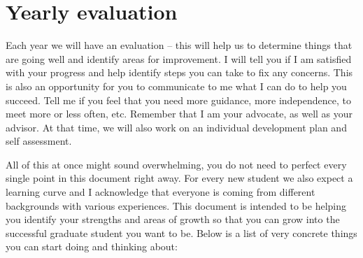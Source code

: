 \documentclass{article}
\begin{document}
\section*{Yearly evaluation}

Each year we will have an evaluation – this will help us to determine things that are going well and identify areas for improvement. I will tell you if I am satisfied with your progress and help identify steps you can take to fix any concerns. This is also an opportunity for you to communicate to me what I can do to help you succeed. Tell me if you feel that you need more guidance, more independence, to meet more or less often, etc. Remember that
I am your advocate, as well as your advisor.  At that time, we will also work on an individual development plan and self assessment.
	
All of this at once might sound overwhelming, you do not need to perfect every single point in this document right away. For every new student we also expect a learning curve and I acknowledge that everyone is coming from different backgrounds with various experiences. This document is intended to be helping you identify your strengths and areas of growth so that you can grow into the successful graduate student you want to be. Below is a list of very concrete things you can start doing and thinking about:
\end{document}
